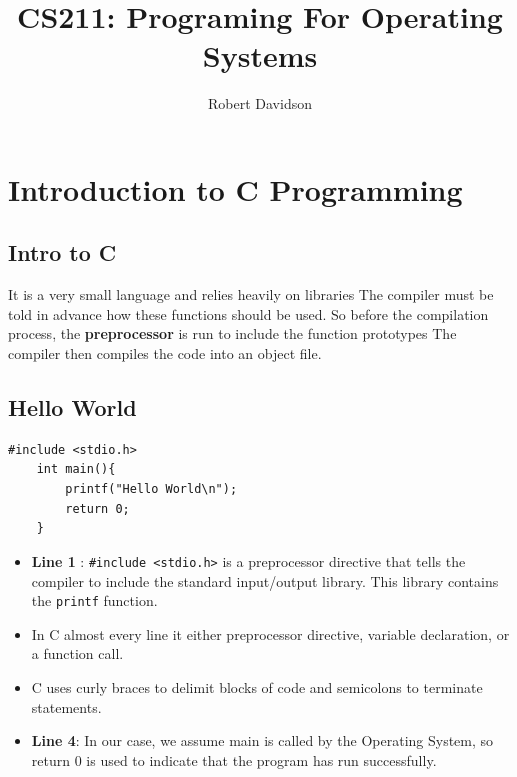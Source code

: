 \documentclass[a4paper, 10pt]{article}
\title{
\textbf{CS211: Programing For Operating Systems} \\ 
}
\author{
Robert Davidson
}
\date{}
\begin{document}
\maketitle
\pagebreak
\scriptsize
\tableofcontents
\normalsize
\pagebreak
\section{Introduction to C Programming}
\subsection{Intro to C}
It is a very small language and relies heavily on libraries
The compiler must be told in advance how these functions should be used. So before the compilation process, the \textbf{preprocessor} is run to include the function prototypes The compiler then compiles the code into an object file.

\subsection{Hello World}
\begin{lstlisting}[style=cStyle, caption={Hello World in C}]
    #include <stdio.h>
    int main(){
        printf("Hello World\n");
        return 0;
    }
    \end{lstlisting}
\begin{itemize}
    \item \textbf{Line 1} : \texttt{\#include <stdio.h>} is a preprocessor directive that tells the compiler to include the standard input/output library. This library contains the \texttt{printf} function.
    \item In C almost every line it either preprocessor directive, variable declaration, or a function call.
    \item C uses curly braces to delimit blocks of code and semicolons to terminate statements.
    \item \textbf{Line 4}: In our case, we assume main is called by the Operating System, so return 0 is used to indicate that the program has run successfully.
\end{itemize}
\end{document}
